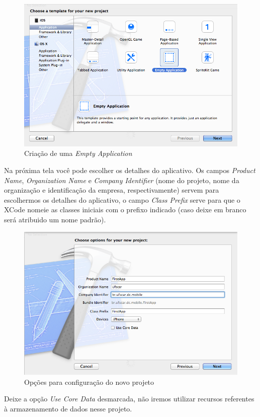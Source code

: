 \documentclass[a4paper,12pt,brazil,doubleside]{book}
\begin{document}
\begin{singlespace}
\begin{figure}[H]
  \centering
  \includegraphics[width=.75\textwidth]{figuras/3/tela_novo_projeto_1.png}
  \caption{Criação de uma \emph{Empty Application}}
  \label{fig:a}
\end{figure}

Na próxima tela você pode escolher os detalhes do aplicativo. Os campos \emph{Product Name}, \emph{Organization Name} e \emph{Company Identifier} (nome do projeto, nome da organização e identificação da empresa, respectivamente) servem para escolhermos os detalhes do aplicativo, o campo \emph{Class Prefix} serve para que o XCode nomeie as classes iniciais com o prefixo indicado (caso deixe em branco será atribuido um nome padrão).

\begin{figure}[H]
  \centering
  \includegraphics[width=.75\textwidth]{figuras/3/tela_novo_projeto_2.png}
  \caption{Opções para configuração do novo projeto}
  \label{fig:a}
\end{figure}

Deixe a opção \emph{Use Core Data} desmarcada, não iremos utilizar recursos referentes à armazenamento de dados nesse projeto.

\begin{framed}


\end{framed}
\end{singlespace}
\end{document}
